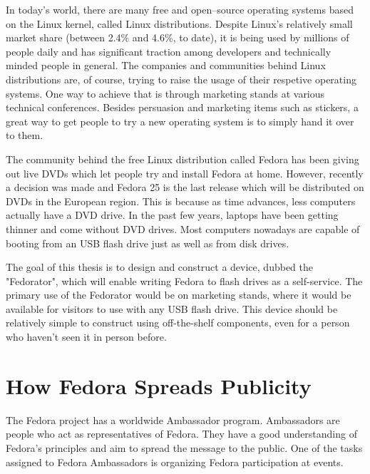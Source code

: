 \label{Introduction}
    In today's world, there are many free and open–source operating systems based on the Linux kernel, called Linux distributions\cite{whatislinux}.  Despite Linux's relatively small market share (between 2.4\% and 4.6\%, to date\cite{linuxmarketshare}), it is being used by millions of people daily and has significant traction among developers\cite{sosurvey} and technically minded people in general.  The companies and communities behind Linux distributions are, of course, trying to raise the usage of their respetive operating systems.  One way to achieve that is through marketing stands at various technical conferences.  Besides persuasion and marketing items such as stickers, a great way to get people to try a new operating system is to simply hand it over to them.

    The community behind the free Linux distribution called Fedora\cite{fedora} has been giving out live DVDs which let people try and install Fedora at home.  However, recently a decision was made and Fedora 25 is the last release which will be distributed on DVDs in the European region.   This is because as time advances, less computers actually have a DVD drive.  In the past few years, laptops have been getting thinner and come without DVD drives\cite{laptopdvd}.  Most computers nowadays are capable of booting from an USB flash drive just as well as from disk drives.
    
    The goal of this thesis is to design and construct a device, dubbed the "Fedorator", which will enable writing Fedora to flash drives as a self-service.  The primary use of the Fedorator would be on marketing stands, where it would be available for visitors to use with any USB flash drive.  This device should be relatively simple to construct using off-the-shelf components, even for a person who haven't seen it in person before.
    \section{How Fedora Spreads Publicity}
        The Fedora project has a worldwide Ambassador program.  Ambassadors are people who act as representatives of Fedora.  They have a good understanding of Fedora's principles and aim to spread the message to the public\cite{fedora-ambassadors}.  One of the tasks assigned to Fedora Ambassadors is organizing Fedora participation at events.
        \blind[3]
